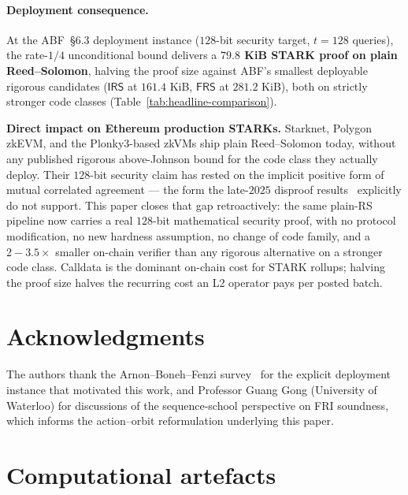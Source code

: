 \documentclass[11pt]{article}
\theoremstyle{definition}
\theoremstyle{remark}
\begin{document}
\paragraph{Deployment consequence.}
At the ABF~\S 6.3 deployment instance ($128$-bit security target,
$t = 128$ queries), the rate-$1/4$ unconditional bound delivers a
\textbf{$79.8$ KiB STARK proof on plain Reed--Solomon}, halving the
proof size against ABF's smallest deployable rigorous candidates
($\mathsf{IRS}$ at $161.4$ KiB, $\mathsf{FRS}$ at $281.2$ KiB), both
on strictly stronger code classes (Table~\ref{tab:headline-comparison}).

\smallskip\noindent
\textbf{Direct impact on Ethereum production STARKs.} Starknet, Polygon
zkEVM, and the Plonky3-based zkVMs ship plain Reed--Solomon today,
without any published rigorous above-Johnson bound for the code class
they actually deploy. Their $128$-bit security claim has rested on
the implicit positive form of mutual correlated agreement --- the form
the late-$2025$ disproof results~\cite{CritesStewart2025,BCHKS,DiamondGruen}
explicitly do not support. This paper closes that gap retroactively:
the same plain-RS pipeline now carries a real $128$-bit mathematical
security proof, with no protocol modification, no new hardness
assumption, no change of code family, and a $2{-}3.5\times$ smaller
on-chain verifier than any rigorous alternative on a stronger code
class. Calldata is the dominant on-chain cost for STARK rollups;
halving the proof size halves the recurring cost an L2 operator pays
per posted batch.

\section*{Acknowledgments}

The authors thank the Arnon--Boneh--Fenzi survey~\cite{ABF} for the
explicit deployment instance that motivated this work, and Professor
Guang Gong (University of Waterloo) for discussions of the
sequence-school perspective on FRI soundness, which informs the
action--orbit reformulation underlying this paper.

\appendix

\section{Computational artefacts}
\label{app:scripts}
\end{document}
